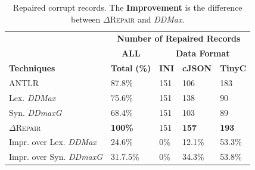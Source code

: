 \documentclass[sigconf,review,anonymous]{acmart}
\newcommand{\formatfree}{format-free\xspace}
\newcommand{\dtask}{data repair\xspace}
\newcommand{\approach}{\textsc{$\Delta$Repair}\xspace}
\newcommand{\ANTLR}{ANTLR\xspace}
\newcommand{\ddmax}{\textit{DDMax}\xspace}
\newcommand{\ddmaxg}{\textit{DDmaxG}\xspace}
\newcommand{\drepair}{\approach}
\begin{document}
\begin{table}[!tbp]
  \footnotesize
\centering
  \caption{Repaired corrupt records. The \textbf{Improvement} is the difference between \drepair and \ddmax.}
\begin{tabular}{|p{3.0cm}|p{1cm}|p{1cm}|p{1cm}|p{1cm}|}
\hline
&  \multicolumn{4}{c|}{\textbf{Number of Repaired Records}}  \\
&  \multicolumn{1}{c|}{\textbf{ALL}} & \multicolumn{3}{c|}{\textbf{Data Format}}  \\
\textbf{Techniques} & \textbf{Total} \textbf{(\%)} & \textbf{INI} & \textbf{cJSON} & \textbf{TinyC} \\
\hline
  \ANTLR & 87.8\% & 151 & 106 & 183   \\
  Lex. \ddmax & 75.6\% & 151  & 138 & 90  \\
  Syn. \ddmaxg & 68.4\% & 151  & 103  & 89  \\ 	
\approach  & \textbf{100\%} & 151 & \textbf{157}  & \textbf{193} \\
\hline
Impr. over Lex. \ddmax &  24.6\%  & 0\% & 12.1\% & 53.3\% \\
Impr. over Syn. \ddmaxg &  31.7.5\%  & 0\% & 34.3\% & 53.8\% \\
\hline
\end{tabular}
\label{tab:effectiveness}
\end{table}

%
\end{document}
